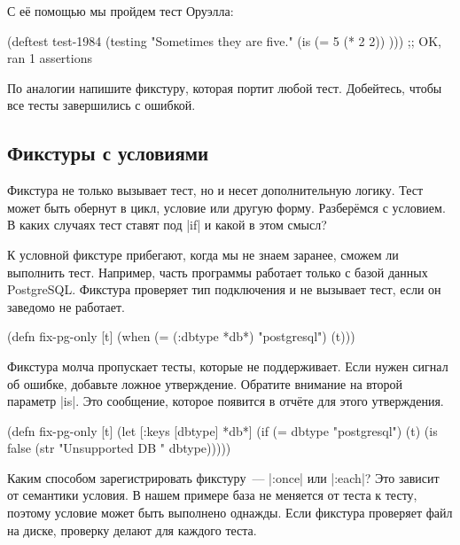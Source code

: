
\noindent
С е\"{е} помощью мы пройдем тест Оруэлла:

\begin{english}
  \begin{clojure}
(deftest test-1984
  (testing "Sometimes they are five."
    (is (= 5 (* 2 2)) )))
;; OK, ran 1 assertions
  \end{clojure}
\end{english}

По аналогии напишите фикстуру, которая портит любой тест. Добейтесь, чтобы все
тесты завершились с ошибкой.

\subsection{Фикстуры с условиями}


Фикстура не только вызывает тест, но и несет дополнительную логику. Тест может
быть обернут в цикл, условие или другую форму. Разбер\"{е}мся с условием. В
каких случаях тест ставят под \spverb|if| и какой в этом смысл?

К условной фикстуре прибегают, когда мы не знаем заранее, сможем ли выполнить
тест. Например, часть программы работает только с базой данных
PostgreSQL. Фикстура проверяет тип подключения и не вызывает тест, если он
заведомо не работает.

\begin{english}
  \begin{clojure}
(defn fix-pg-only [t]
  (when (= (:dbtype *db*) "postgresql")
    (t)))
  \end{clojure}
\end{english}

Фикстура молча пропускает тесты, которые не поддерживает. Если нужен сигнал об
ошибке, добавьте ложное утверждение. Обратите внимание на второй параметр
\spverb|is|. Это сообщение, которое появится в отч\"{е}те для этого утверждения.

\begin{english}
  \begin{clojure}
(defn fix-pg-only [t]
  (let [{:keys [dbtype]} *db*]
    (if (= dbtype "postgresql")
      (t)
      (is false (str "Unsupported DB " dbtype)))))
  \end{clojure}
\end{english}

Каким способом зарегистрировать фикстуру~--- \spverb|:once| или \spverb|:each|?
Это зависит от семантики условия. В нашем примере база не меняется от теста к
тесту, поэтому условие может быть выполнено однажды. Если фикстура проверяет
файл на диске, проверку делают для каждого теста.

